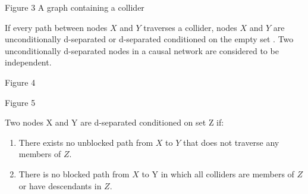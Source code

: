 \documentclass{article}
\begin{document}
\begin{center}
Figure 3 A graph containing a collider
\end{center}

If every path between nodes $ X $ and $ Y $ traverses a collider, nodes $ X $ and $ Y $ are unconditionally d-separated or d-separated conditioned on the empty set \cite{pearl2003causality}. Two unconditionally d-separated nodes in a causal network are considered to be independent\cite{pearl2009}.
\\
\begin{center}
\end{center}

\begin{center}
Figure 4
\end{center}

\begin{center}
\end{center}

\begin{center}
Figure 5
\end{center}


Two nodes X and Y are d-separated conditioned on set Z if:
\begin{enumerate}
	\item There exists no unblocked path from $ X $ to $ Y $ that does not traverse any members of $ Z $.\cite{pearl2003causality}
	\item There is no blocked path from $ X $ to Y in which all colliders are members of $ Z $ or have descendants in $ Z $. \cite{pearl2003causality}
\end{enumerate} 
\end{document}
